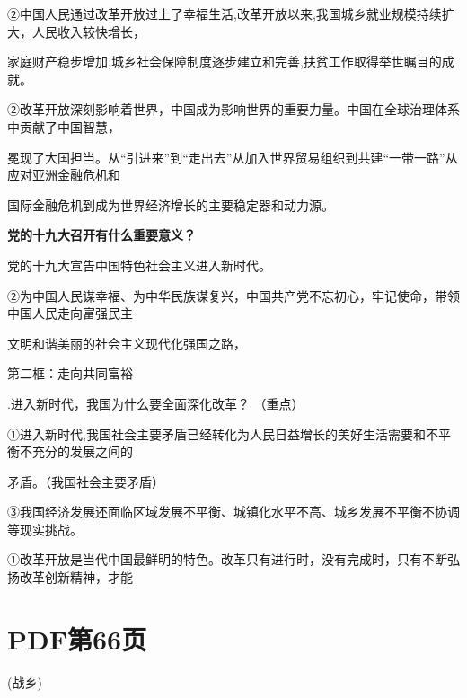 \documentclass[lang=cn,11pt]{elegantbook}
\newcommand{\daofasym}[1]{{\daofasymbolfont #1}}
\newcommand{\daofasym}[1]{#1}
\begin{document}
\daofasym{②}中国人民通过改革开放过上了幸福生活,改革开放以来,我国城乡就业规模持续扩大，人民收入较快增长，\par

家庭财产稳步增加,城乡社会保障制度逐步建立和完善,扶贫工作取得举世瞩目的成就。\par

\daofasym{②}改革开放深刻影响着世界，中国成为影响世界的重要力量。中国在全球治理体系中贡献了中国智慧，\par

冕现了大国担当。从“引进来”到“走出去”从加入世界贸易组织到共建“一带一路”从应对亚洲金融危机和\par

国际金融危机到成为世界经济增长的主要稳定器和动力源。\par

\textbf{党的十九大召开有什么重要意义？}\par

党的十九大宣告中国特色社会主义进入新时代。\par

\daofasym{②}为中国人民谋幸福、为中华民族谋复兴，中国共产党不忘初心，牢记使命，带领中国人民走向富强民主\par

文明和谐美丽的社会主义现代化强国之路，\par

第二框：走向共同富裕\par

.进入新时代，我国为什么要全面深化改革？ （重点）\par

\daofasym{①}进入新时代,我国社会主要矛盾已经转化为人民日益增长的美好生活需要和不平衡不充分的发展之间的\par

矛盾。（我国社会主要矛盾）\par

\daofasym{③}我国经济发展还面临区域发展不平衡、城镇化水平不高、城乡发展不平衡不协调等现实挑战。\par

\daofasym{①}改革开放是当代中国最鲜明的特色。改革只有进行时，没有完成时，只有不断弘扬改革创新精神，才能\par


\section*{PDF第66页}

(战乡)\par
\end{document}
